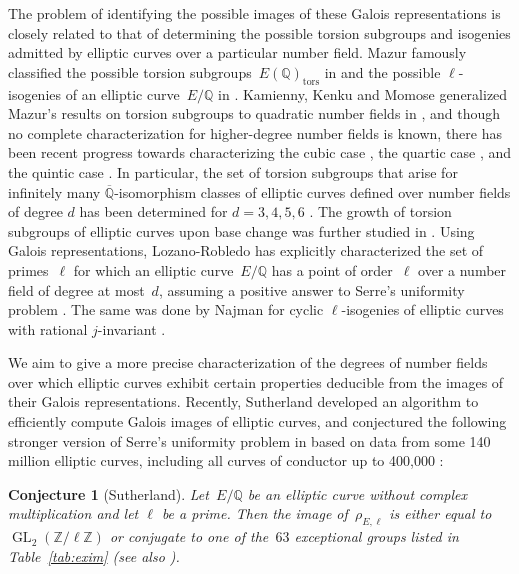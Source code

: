 \documentclass[table,dvipsnames]{amsart}
\newcommand{\Q}{\mathbb{Q}}
\newcommand{\Qbar}{\overline{\Q}}
\newcommand{\GL}{\operatorname{GL}}
\newcommand{\Z}{\mathbb{Z}}
\newcommand{\tor}{\mathrm{tors}}
\newtheorem{conjecture}[theorem]{Conjecture}
\numberwithin{equation}{section}
\begin{document}
The problem of identifying the possible images of these Galois representations is closely related to that of determining the possible torsion subgroups and isogenies admitted by elliptic curves over a particular number field. Mazur famously classified the possible torsion subgroups~$E(\Q)_\tor$ in \cite{mazur1977} and the possible $\ell$-isogenies of an elliptic curve~$E/\Q$ in \cite{mazur1978}. Kamienny, Kenku and Momose generalized Mazur's results on torsion subgroups to quadratic number fields in \cite{kamienny1992,kenku1988}, and though no complete characterization for higher-degree number fields is known, there has been recent progress towards characterizing the cubic case \cite{jeon2011,najman2012a,jeon2016,bruin2016,wang2015,najman2016}, the quartic case \cite{jeon2013,najman2012b,gonzalezjimenez2016a,chou2016}, and the quintic case \cite{gonzalezjimenez2016b,clark2014}. In particular, the set of torsion subgroups that arise for infinitely many $\Qbar$-isomorphism classes of elliptic curves defined over number fields of degree $d$ has been determined for $d=3,4,5,6$ \cite{jeon2004,jeon2006,derickx}. The growth of torsion subgroups of elliptic curves upon base change was further studied in \cite{gonzalezjimenez2016c,lozanorobledo2015a}. Using Galois representations, Lozano-Robledo has explicitly characterized the set of primes~$\ell$ for which an elliptic curve~$E/\Q$ has a point of order~$\ell$ over a number field of degree at most~$d$, assuming a positive answer to Serre's uniformity problem \cite{lozanorobledo2013}. The same was done by Najman for cyclic $\ell$-isogenies of elliptic curves with rational $j$-invariant \cite{najman2015}.

We aim to give a more precise characterization of the degrees of number fields over which elliptic curves exhibit certain properties deducible from the images of their Galois representations. Recently, Sutherland developed an algorithm to efficiently compute Galois images of elliptic curves, and conjectured the following stronger version of Serre's uniformity problem in \cite[Conj.~1.1]{sutherland2016} based on data from some 140 million elliptic curves, including all curves of conductor up to 400,000 \cite{cremonatable}:
\begin{conjecture}[Sutherland]
\label{conj:sutherland}
Let~$E/\Q$ be an elliptic curve without complex multiplication and let $\ell$ be a prime. Then the image of~$\rho_{E,\ell}$ is either equal to~$\GL_2(\Z/\ell\Z)$ or conjugate to one of the~$63$ exceptional groups listed in Table~\ref{tab:exim} (see also \cite[Tables~3,4]{sutherland2016}).
\end{conjecture}
\end{document}
